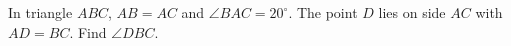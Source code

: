 In triangle $ABC$, $AB=AC$ and $\angle BAC=20^\circ$. The point $D$ lies on side $AC$ with $AD=BC$. Find $\angle DBC$.

